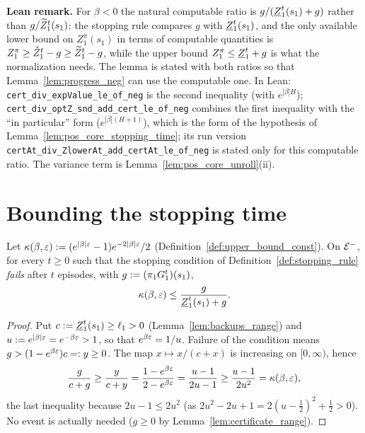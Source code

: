 \textbf{Lean remark.} For $\beta < 0$ the natural computable ratio is
$g/(\underline{Z}_1^t(s_1) + g)$ rather than $g/\widetilde{Z}_1^t(s_1)$: the stopping rule compares $g$ with
$\underline{Z}_1^t(s_1)$, and the only available lower bound on $Z^\pi_1(s_1)$ in terms of computable quantities is
$Z^\pi_1 \ge \mathring{Z}_1^t - g \ge \widetilde{Z}^t_1 - g$, while the upper bound $Z^\pi_1 \le \underline{Z}_1^t + g$ is what the
normalization needs. The lemma is stated with both ratios so that Lemma~\ref{lem:progress_neg} can
use the computable one. In Lean: \texttt{cert\_div\_expValue\_le\_of\_neg} is the second inequality
(with $e^{|\beta|H}$); \texttt{cert\_div\_optZ\_snd\_add\_cert\_le\_of\_neg} combines the first inequality with the
``in particular'' form ($e^{|\beta|(H+1)}$), which is the form of the hypothesis of
Lemma~\ref{lem:pos_core_stopping_time}; its run version \texttt{certAt\_div\_ZlowerAt\_add\_certAt\_le\_of\_neg}
is stated only for this computable ratio. The variance term is Lemma~\ref{lem:pos_core_unroll}(ii).

\section{Bounding the stopping time}
\label{sec:neg_stopping_time}

\begin{lemma}\label{lem:progress_neg}
\leanok
{}
Let $\kappa(\beta, \varepsilon) := (e^{|\beta|\varepsilon} - 1)e^{-2|\beta|\varepsilon}/2$ (Definition~\ref{def:upper_bound_const}).
On $\mathcal{E}^-$, for every $t \ge 0$ such that the stopping condition of Definition~\ref{def:stopping_rule}
\emph{fails} after $t$ episodes, with $g := (\pi_1G_1^t)(s_1)$,
\[
  \kappa(\beta, \varepsilon) \le \frac{g}{\underline{Z}_1^t(s_1) + g} .
\]
\end{lemma}

\begin{proof}
\leanok
Put $c := \underline{Z}_1^t(s_1) \ge \ell_1 > 0$ (Lemma~\ref{lem:backups_range}) and $u := e^{|\beta|\varepsilon} = e^{-\beta\varepsilon} > 1$,
so that $e^{\beta\varepsilon} = 1/u$. Failure of the condition means $g > (1 - e^{\beta\varepsilon})c =: y \ge 0$. The map
$x \mapsto x/(c + x)$ is increasing on $[0, \infty)$, hence
\[
  \frac{g}{c + g} \ge \frac{y}{c + y} = \frac{1 - e^{\beta\varepsilon}}{2 - e^{\beta\varepsilon}} = \frac{u - 1}{2u - 1}
  \ge \frac{u - 1}{2u^2} = \kappa(\beta, \varepsilon),
\]
the last inequality because $2u - 1 \le 2u^2$ (as $2u^2 - 2u + 1 = 2(u - \tfrac12)^2 + \tfrac12 > 0$). No event
is actually needed ($g \ge 0$ by Lemma~\ref{lem:certificate_range}).
\end{proof}

